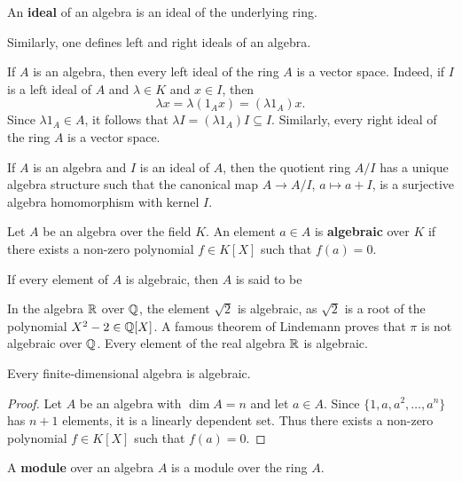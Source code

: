 \begin{definition}
 	An \textbf{ideal} of an algebra is an ideal of the underlying ring.
\end{definition}

Similarly, one defines left and right ideals of an algebra.

If $A$ is an algebra, then every left ideal of the ring $A$ is a vector space.  
Indeed, if $I$ is a left ideal of $A$ 
and $\lambda\in K$ and $x\in I$, then 
\[
	\lambda x=\lambda (1_Ax)=(\lambda 1_A)x.
\]
Since $\lambda 1_A\in A$, it follows that  $\lambda I=(\lambda
1_A)I\subseteq I$. 
Similarly, every right ideal of the ring $A$ is a vector space. 

If $A$ is an algebra and $I$ is an ideal of $A$, then the quotient ring $A/I$ has a unique algebra
structure such that the canonical map  
$A\to A/I$, $a\mapsto a+I$, is a surjective algebra homomorphism with kernel $I$. 

\begin{definition}
    Let $A$ be an algebra over the field $K$. An element $a\in A$ is 
    \textbf{algebraic} over $K$ if there exists a non-zero polynomial $f\in K[X]$
    such that $f(a)=0$. 
\end{definition}

If every element of $A$ is algebraic, then $A$ is said to be  

In the algebra $\mathbb{R}$ over $\mathbb{Q}$, the element $\sqrt{2}$ is algebraic, as $\sqrt{2}$ is a root of the polynomial $X^2-2\in\mathbb{Q}[X]$. A famous theorem of Lindemann proves that $\pi$ is not algebraic over $\mathbb{Q}$. Every element of the real algebra $\mathbb{R}$ is algebraic.

\begin{proposition}
	\label{lem:algebraic}
	Every finite-dimensional algebra is algebraic.
\end{proposition}

\begin{proof}
   Let $A$ be an algebra with $\dim A=n$ and let $a\in A$. Since  
	$\{1,a,a^2,\dots,a^n\}$ has $n+1$ elements, it is a linearly dependent set. Thus there exists 
	a non-zero polynomial $f\in K[X]$ such that $f(a)=0$.
\end{proof}

\begin{definition}
    A \textbf{module} over an algebra $A$ is a module 
    over the ring $A$.
\end{definition}

